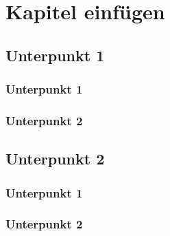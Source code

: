 %

\chapter{Kapitel einfügen}
    \section{Unterpunkt 1}
	\label{sec:unterpunkt1}
                    
        \subsection{Unterpunkt 1}
            \blindtext							%
        
        \subsection{Unterpunkt 2}
            \blindtext							%
    
    \section{Unterpunkt 2}
    
	    \subsection{Unterpunkt 1}
	    \label{subsec:lalalulale}
	    \blindtext								%
	    
	    \subsection{Unterpunkt 2}
	    \blindtext								%